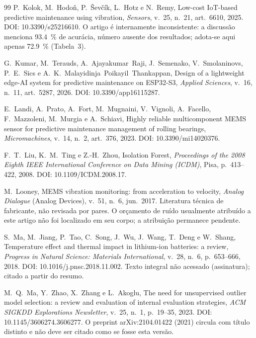 \documentclass[11pt,a4paper]{article}
\begin{document}
\begin{thebibliography}{99}
P.~Kolok, M.~Hodoň, P.~Ševčík, L.~Hotz e N.~Remy,
\newblock Low-cost IoT-based predictive maintenance using vibration,
\newblock \emph{Sensors}, v.~25, n.~21, art.~6610, 2025.
\newblock DOI: 10.3390/s25216610.
\newblock O artigo é internamente inconsistente: a discussão menciona \SI{93,4}{\percent} de acurácia, número ausente dos resultados; adota-se aqui apenas \SI{72,9}{\percent} (Tabela~3).

G.~Kumar, M.~Terauds, A.~Ajayakumar~Raji, J.~Semenako, V.~Smolaninovs, P.~E.~Sics e A.~K.~Malayidinja~Poikayil~Thankappan,
\newblock Design of a lightweight edge-AI system for predictive maintenance on ESP32-S3,
\newblock \emph{Applied Sciences}, v.~16, n.~11, art.~5287, 2026.
\newblock DOI: 10.3390/app16115287.

E.~Landi, A.~Prato, A.~Fort, M.~Mugnaini, V.~Vignoli, A.~Facello, F.~Mazzoleni, M.~Murgia e A.~Schiavi,
\newblock Highly reliable multicomponent MEMS sensor for predictive maintenance management of rolling bearings,
\newblock \emph{Micromachines}, v.~14, n.~2, art.~376, 2023.
\newblock DOI: 10.3390/mi14020376.

F.~T.~Liu, K.~M.~Ting e Z.-H.~Zhou,
\newblock Isolation Forest,
\newblock \emph{Proceedings of the 2008 Eighth IEEE International Conference on Data Mining (ICDM)}, Pisa, p.~413--422, 2008.
\newblock DOI: 10.1109/ICDM.2008.17.

M.~Looney,
\newblock MEMS vibration monitoring: from acceleration to velocity,
\newblock \emph{Analog Dialogue} (Analog Devices), v.~51, n.~6, jun.\ 2017.
\newblock Literatura técnica de fabricante, não revisada por pares. O orçamento de ruído usualmente atribuído a este artigo não foi localizado em seu corpo; a atribuição permanece pendente.

S.~Ma, M.~Jiang, P.~Tao, C.~Song, J.~Wu, J.~Wang, T.~Deng e W.~Shang,
\newblock Temperature effect and thermal impact in lithium-ion batteries: a review,
\newblock \emph{Progress in Natural Science: Materials International}, v.~28, n.~6, p.~653--666, 2018.
\newblock DOI: 10.1016/j.pnsc.2018.11.002.
\newblock Texto integral não acessado (assinatura); citado a partir do resumo.

M.~Q.~Ma, Y.~Zhao, X.~Zhang e L.~Akoglu,
\newblock The need for unsupervised outlier model selection: a review and evaluation of internal evaluation strategies,
\newblock \emph{ACM SIGKDD Explorations Newsletter}, v.~25, n.~1, p.~19--35, 2023.
\newblock DOI: 10.1145/3606274.3606277.
\newblock O preprint arXiv:2104.01422 (2021) circula com título distinto e não deve ser citado como se fosse esta versão.


\end{thebibliography}
\end{document}
